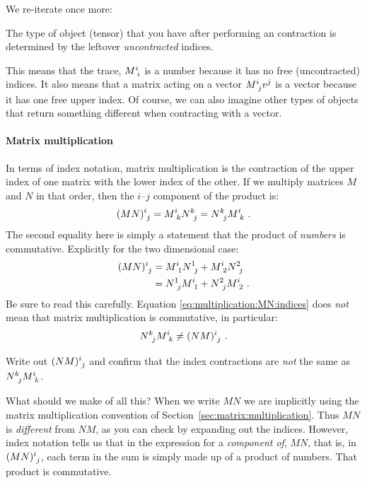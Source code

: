 \documentclass[12pt, oneside]{report}    %
\begin{document}
We re-iterate once more:
\begin{newrule} The type of object (tensor) that you have after performing an contraction is determined by the leftover \emph{uncontracted} indices.
\end{newrule}
This means that the trace, $M\aij{i}{i}$ is a number because it has no free (uncontracted) indices. It also means that a matrix acting on a vector $M\aij{i}{j}v^j$ is a vector because it has one free upper index. Of course, we can also imagine other types of objects that return something different when contracting with a vector.

\paragraph{Matrix multiplication} In terms of index notation, matrix multiplication is the contraction of the upper index of one matrix with the lower index of the other. If we multiply matrices $M$ and $N$ in that order, then the $i$--$j$ component of the product is:
\begin{align}
    (MN)\aij{i}{j} =   M\aij{i}{k} N\aij{k}{j}  = N\aij{k}{j} M\aij{i}{k} \ .\label{eq:multiplication:MN:indices}
\end{align}
The second equality here is simply a statement that the product of \emph{numbers} is commutative. Explicitly for the two dimensional case:
\begin{align}
    (MN)\aij{i}{j} &= 
    M\aij{i}{1} N\aij{1}{j} + M\aij{i}{2} N\aij{2}{j}\\
    &=
    N\aij{1}{j} M\aij{i}{1}  + N\aij{2}{j} M\aij{i}{2} \ .
\end{align}
Be sure to read this carefully. Equation \eqref{eq:multiplication:MN:indices} does \emph{not} mean that matrix multiplication is commutative, in particular:
\begin{align}
    N\aij{k}{j} M\aij{i}{k} \neq (NM)\aij{i}{j} \ .
\end{align}
\begin{exercise}
Write out $(NM)\aij{i}{j}$ and confirm that the index contractions are \emph{not} the same as $N\aij{k}{j} M\aij{i}{k}$.
\end{exercise}
What should we make of all this? When we write $MN$ we are implicitly using the matrix multiplication convention of Section~\ref{sec:matrix:multiplication}. Thus $MN$ is \emph{different} from $NM$, as you can check by expanding out the indices. However, index notation tells us that in the expression for a \emph{component of}, $MN$, that is, in $(MN)\aij{i}{j}$, each term in the sum is simply made up of a product of numbers. That product is commutative. 
\end{document}
